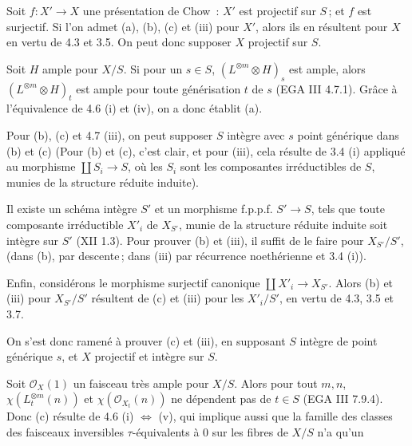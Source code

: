 Soit \(f:X'\to X\) une pr\'esentation de Chow~: \(X'\) est projectif sur \(S\)\,; et \(f\) est surjectif. Si l'on admet (a), (b), (c) et (iii) pour \(X'\), alors ils en r\'esultent pour \(X\) en vertu de 4.3 et 3.5. On peut donc supposer \(X\) projectif sur \(S\).

Soit \(H\) ample pour \(X/S\). Si pour un \(s\in S\), \((L^{\otimes m}\otimes H)_s\) est ample, alors \((L^{\otimes m}\otimes H)_t\) est ample pour toute g\'en\'erisation \(t\) de \(s\) (EGA III 4.7.1). Gr\^ace \`a l'\'equivalence de 4.6 (i) et (iv), on a donc \'etablit (a).

Pour (b), (c) et 4.7 (iii), on peut supposer \(S\) int\`egre avec \(s\) point g\'en\'erique dans (b) et (c) (Pour (b) et (c), c'est clair, et pour (iii), cela r\'esulte de 3.4 (i) appliqu\'e au morphisme \(\coprod S_i\to S\), o\`u les \(S_i\) sont les composantes irr\'eductibles de \(S\), munies de la structure r\'eduite induite).

Il existe un sch\'ema int\`egre \(S'\) et un morphisme f.p.p.f. \(S'\to S\), tels que toute composante irr\'eductible \(X'_i\) de \(X_{S'}\), munie de la structure r\'eduite induite soit int\`egre sur \(S'\) (XII 1.3). Pour prouver (b) et (iii), il suffit de le faire pour \(X_{S'}/S'\), (dans (b), par descente\,; dans (iii) par r\'ecurrence noeth\'erienne et 3.4 (i)).

Enfin, consid\'erons le morphisme surjectif canonique \(\coprod X'_i\to X_{S'}\). Alors (b) et (iii) pour \(X_{S'}/S'\) r\'esultent de (c) et (iii) pour les \(X'_i/S'\), en vertu de 4.3, 3.5 et 3.7.

On s'est donc ramen\'e \`a prouver (c) et (iii), en supposant \(S\) int\`egre de point g\'en\'erique \(s\), et \(X\) projectif et int\`egre sur \(S\).

Soit \(\mathcal O_X(1)\) un faisceau tr\`es ample pour \(X/S\). Alors pour tout \(m,n\), \(\chi(L_t^{\otimes m}(n))\) et \(\chi(\mathcal O_{X_t}(n))\) ne d\'ependent pas de \(t\in S\) (EGA III 7.9.4). Donc (c) r\'esulte de 4.6 (i) \(\Longleftrightarrow\) (v), qui implique aussi que la famille des classes des faisceaux inversibles \(\tau\)-\'equivalents \`a \(0\) sur les fibres de \(X/S\) n'a qu'un
